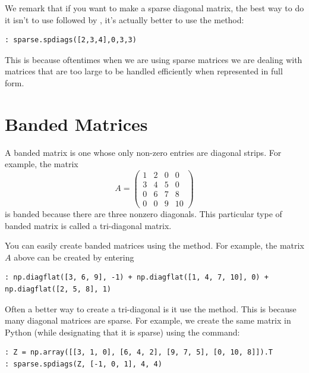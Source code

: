 We remark that if you want to make a sparse diagonal matrix, the
best way to do it isn't to use  followed by ,
it's actually better to use the  method:
\begin{lstlisting}
: sparse.spdiags([2,3,4],0,3,3)
\end{lstlisting}
This is because oftentimes when we are using sparse matrices we are dealing with matrices 
that are too large to be handled efficiently when represented in full form.

\section*{Banded Matrices}
A banded matrix is one whose only non-zero entries are diagonal
strips.  For example, the matrix
\begin{equation*}
A = \begin{pmatrix} 
1 & 2 & 0 & 0 \\
3 & 4 & 5 & 0 \\
0 & 6 & 7 & 8 \\
0 & 0 & 9 & 10
\end{pmatrix}
\end{equation*}
is banded because there are three nonzero diagonals.  This
particular type of banded matrix is called a tri-diagonal matrix.

You can easily create banded matrices using the  method.
For example, the matrix $A$ above can be created by entering
\begin{lstlisting}
: np.diagflat([3, 6, 9], -1) + np.diagflat([1, 4, 7, 10], 0) + np.diagflat([2, 5, 8], 1)
\end{lstlisting}

Often a better way to create a tri-diagonal is it use the  method. 
This is because many diagonal matrices are sparse. 
For example, we create the same matrix in Python (while designating that it is sparse) using the command:
\begin{lstlisting}
: Z = np.array([[3, 1, 0], [6, 4, 2], [9, 7, 5], [0, 10, 8]]).T
: sparse.spdiags(Z, [-1, 0, 1], 4, 4)
\end{lstlisting}

